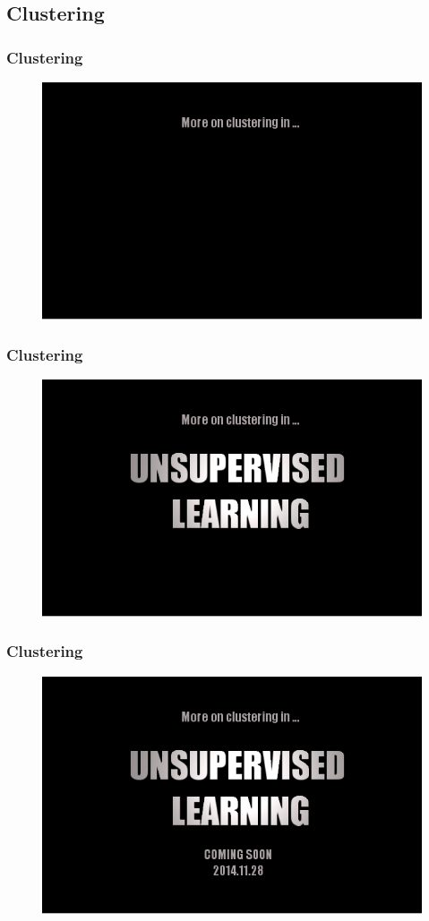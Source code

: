 \documentclass[table]{beamer}
\begin{document}
\subsection{Clustering}
\frame
{
	\frametitle{Clustering}
	\begin{figure}
		\includegraphics[scale=0.45]{fig/ulcs1.png}		
	\end{figure}
}
\frame
{
	\frametitle{Clustering}
	\begin{figure}
		\includegraphics[scale=0.45]{fig/ulcs2.png}		
	\end{figure}
}
\frame
{
	\frametitle{Clustering}
	\begin{figure}
		\includegraphics[scale=0.45]{fig/ulcs3.png}		
	\end{figure}
}
\end{document}
